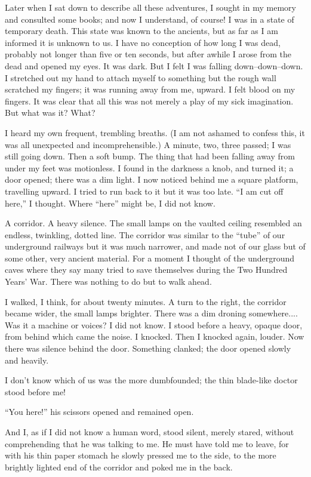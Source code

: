 \documentclass[11pt,openany]{book}
\begin{document}
Later when I sat down to describe all these adventures, I sought in my memory and consulted some books; and now I understand, of course! I was in a state of temporary death. This state was known to the ancients, but as far as I am informed it is unknown to us. I have no conception of how long I was dead, probably not longer than five or ten seconds, but after awhile I arose from the dead and opened my eyes. It was dark. But I felt I was falling down--down--down. I stretched out my hand to attach myself to something but the rough wall scratched my fingers; it was running away from me, upward. I felt blood on my fingers. It was clear that all this was not merely a play of my sick imagination. But what was it? What?

I heard my own frequent, trembling breaths. (I am not ashamed to confess this, it was all unexpected and incomprehensible.) A minute, two, three passed; I was still going down. Then a soft bump. The thing that had been falling away from under my feet was motionless. I found in the darkness a knob, and turned it; a door opened; there was a dim light. I now noticed behind me a square platform, travelling upward. I tried to run back to it but it was too late. ``I am cut off here,'' I thought. Where ``here'' might be, I did not know.

A corridor. A heavy silence. The small lamps on the vaulted ceiling resembled an endless, twinkling, dotted line. The corridor was similar to the ``tube'' of our underground railways but it was much narrower, and made not of our glass but of some other, very ancient material. For a moment I thought of the underground caves where they say many tried to save themselves during the Two Hundred Years' War. There was nothing to do but to walk ahead.

I walked, I think, for about twenty minutes. A turn to the right, the corridor became wider, the small lamps brighter. There was a dim droning somewhere.... Was it a machine or voices? I did not know. I stood before a heavy, opaque door, from behind which came the noise. I knocked. Then I knocked again, louder. Now there was silence behind the door. Something clanked; the door opened slowly and heavily.

I don't know which of us was the more dumbfounded; the thin blade-like doctor stood before me!

``You here!'' his scissors opened and remained open.

And I, as if I did not know a human word, stood silent, merely stared, without comprehending that he was talking to me. He must have told me to leave, for with his thin paper stomach he slowly pressed me to the side, to the more brightly lighted end of the corridor and poked me in the back.
\end{document}
